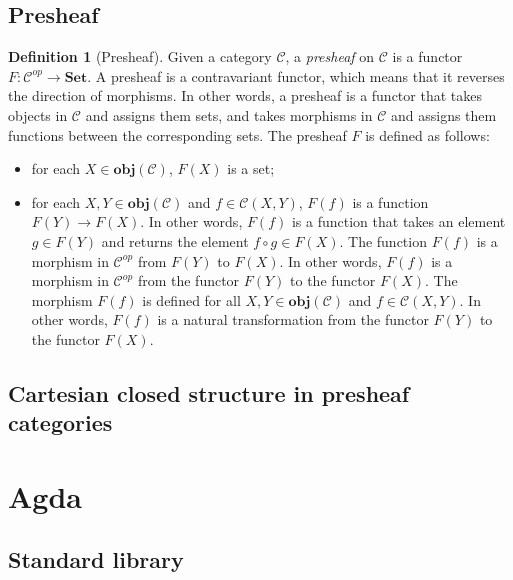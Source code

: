 \documentclass[12pt,twoside,a4paper]{report}
\theoremstyle{definition}
\newtheorem*{definition*}{Definition}
\begin{document}
        \subsection{Presheaf}
        \begin{definition*}[Presheaf]
            Given a category $\mathcal{C}$, a \emph{presheaf} on $\mathcal{C}$ is a functor $F: \mathcal{C}^{op} \to \textbf{Set}$.
            A presheaf is a contravariant functor, which means that it reverses the direction of morphisms.
            In other words, a presheaf is a functor that takes objects in $\mathcal{C}$ and assigns them sets, and takes morphisms in $\mathcal{C}$ and assigns them functions between the corresponding sets.
            The presheaf $F$ is defined as follows:
            \begin{itemize}
                \item 
                    for each $X \in \textbf{obj}(\mathcal{C})$, $F(X)$ is a set;
                \item
                    for each $X, Y \in \textbf{obj}(\mathcal{C})$ and $f \in \mathcal{C}{(X,Y)}$, $F(f)$ is a function $F(Y) \to F(X)$.
                    In other words, $F(f)$ is a function that takes an element $g \in F(Y)$ and returns the element $f \circ g \in F(X)$.
                    The function $F(f)$ is a morphism in $\mathcal{C}^{op}$ from $F(Y)$ to $F(X)$.
                    In other words, $F(f)$ is a morphism in $\mathcal{C}^{op}$ from the functor $F(Y)$ to the functor $F(X)$.
                    The morphism $F(f)$ is defined for all $X, Y \in \textbf{obj}(\mathcal{C})$ and $f \in \mathcal{C}{(X,Y)}$.
                    In other words, $F(f)$ is a natural transformation from the functor $F(Y)$ to the functor $F(X)$.
            \end{itemize}
        \end{definition*}

        \subsection{Cartesian closed structure in presheaf categories}
        


    \section{Agda}
        \subsection{Standard library}
\end{document}
